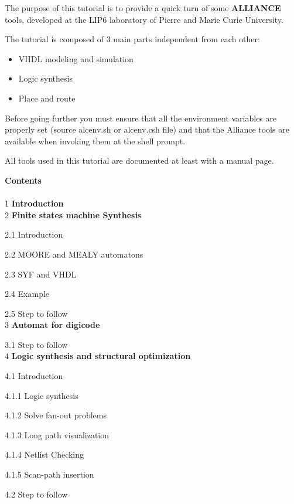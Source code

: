 \documentclass[12pt]{article}
\begin{document}
\newpage
\large{ The purpose of this tutorial is to provide a quick turn of some { \bf
ALLIANCE } tools, developed at the LIP6 laboratory of Pierre and Marie Curie
University.

The tutorial is composed of 3 main parts independent from each other:

\begin{itemize}\itemsep=-.8ex
\item {VHDL modeling and simulation}
\item {Logic synthesis}
\item {Place and route}
\end{itemize}

Before going further you must ensure that all the environment variables are
properly set (source alcenv.sh or alcenv.csh file)
and that the Alliance tools are available when invoking them at the shell
prompt.

All tools used in this tutorial are documented at least with a
manual page.

\newpage
{\bf Contents}\\
\\
 {1} {\bf Introduction}
\\
 {2} {\bf Finite states machine Synthesis}

 {2.1} Introduction

 {2.2} MOORE and MEALY automatons

 {2.3} SYF and VHDL

 {2.4} Example

 {2.5} Step to follow
\\
 {3} {\bf Automat for digicode}

 {3.1} Step to follow
\\
 {4} {\bf Logic synthesis and structural optimization}

 {4.1} Introduction

\hspace{0.5cm} {4.1.1} Logic synthesis

\hspace{0.5cm} {4.1.2} Solve fan-out problems 

\hspace{0.5cm} {4.1.3} Long path visualization 

\hspace{0.5cm} {4.1.4} Netlist Checking

\hspace{0.5cm} {4.1.5} Scan-path insertion

 {4.2} Step to follow

}
\end{document}

